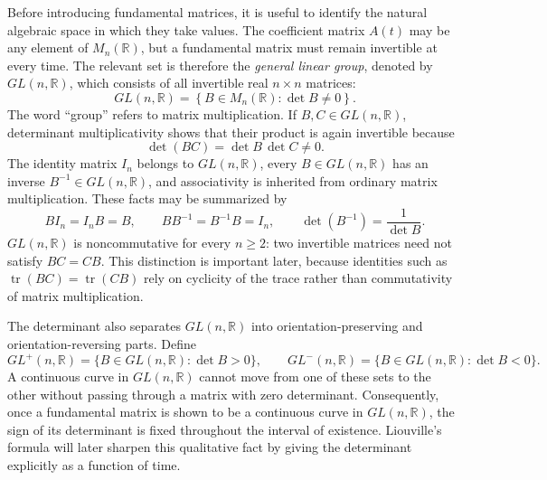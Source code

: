 \documentclass[11pt,a4paper]{article}
\newcommand{\R}{\mathbb{R}}
\DeclareMathOperator{\tr}{tr}
\theoremstyle{definition}
\numberwithin{equation}{section}
\begin{document}
Before introducing fundamental matrices, it is useful to identify the natural algebraic space in which they take values. The coefficient matrix $A(t)$ may be any element of $M_n(\R)$, but a fundamental matrix must remain invertible at every time. The relevant set is therefore the \emph{general linear group}, denoted by $GL(n,\R)$, which consists of all invertible real $n\times n$ matrices:
\begin{equation}
GL(n,\R)
=
\left\{B\in M_n(\R):\det B\neq0\right\}.
\label{eq:GL-definition}
\end{equation}
The word ``group'' refers to matrix multiplication. If $B,C\in GL(n,\R)$, determinant multiplicativity shows that their product is again invertible because
\begin{equation}
\det(BC)=\det B\,\det C\neq0.
\label{eq:GL-closure}
\end{equation}
The identity matrix $I_n$ belongs to $GL(n,\R)$, every $B\in GL(n,\R)$ has an inverse $B^{-1}\in GL(n,\R)$, and associativity is inherited from ordinary matrix multiplication. These facts may be summarized by
\begin{equation}
BI_n=I_nB=B,
\qquad
BB^{-1}=B^{-1}B=I_n,
\qquad
\det(B^{-1})=\frac{1}{\det B}.
\label{eq:GL-identity-inverse}
\end{equation}
$GL(n,\R)$ is noncommutative for every $n\geq2$: two invertible matrices need not satisfy $BC=CB$. This distinction is important later, because identities such as $\tr(BC)=\tr(CB)$ rely on cyclicity of the trace rather than commutativity of matrix multiplication.

The determinant also separates $GL(n,\R)$ into orientation-preserving and orientation-reversing parts. Define
\begin{equation}
GL^{+}(n,\R)=\{B\in GL(n,\R):\det B>0\},
\qquad
GL^{-}(n,\R)=\{B\in GL(n,\R):\det B<0\}.
\label{eq:GL-components}
\end{equation}
A continuous curve in $GL(n,\R)$ cannot move from one of these sets to the other without passing through a matrix with zero determinant. Consequently, once a fundamental matrix is shown to be a continuous curve in $GL(n,\R)$, the sign of its determinant is fixed throughout the interval of existence. Liouville's formula will later sharpen this qualitative fact by giving the determinant explicitly as a function of time.
\end{document}
